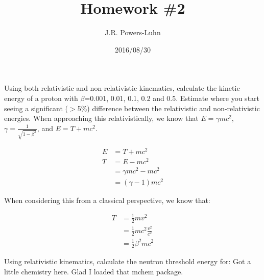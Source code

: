 \documentclass{hw}
\author{J.R. Powers-Luhn}
\date{2016/08/30}
\title{Homework \#2}
\begin{document}
	Using both relativistic and non-relativistic kinematics, calculate the kinetic energy of a proton with $\beta$=0.001, 0.01, 0.1, 0.2 and 0.5. Estimate where you start seeing a significant ($ >$5\%) difference between the relativistic and non-relativistic energies.
\solution
	When approaching this relativistically, we know that $ E=\gamma m c^2 $, $ \gamma = \frac{1}{\sqrt{1-\beta^2}} $, and $E=T+mc^2$. 

	\begin{align}
		E &= T + mc^2\\
		T &= E - mc^2\\
		&= \gamma mc^2 - mc^2\\
		&= (\gamma - 1)mc^2
	\end{align}

	When considering this from a classical perspective, we know that: 

	\begin{align}
		T &= \frac{1}{2}mv^2\\
		&= \frac{1}{2}mc^2\frac{v^2}{c^2}\\
		&= \frac{1}{2}\beta^2 mc^2
	\end{align}

	Using relativistic kinematics, calculate the neutron threshold energy for: 
\solution
	Got a little chemistry here. Glad I loaded that mchem package.
\end{document}
